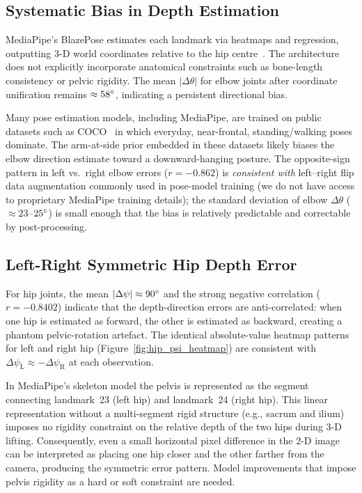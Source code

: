 \documentclass[twocolumn]{article}
\begin{document}
\subsection{Systematic Bias in Depth Estimation}

MediaPipe's BlazePose estimates each landmark via heatmaps and regression,
outputting 3-D world coordinates relative to the hip
centre~\cite{blazepose}. The architecture does not explicitly incorporate
anatomical constraints such as bone-length consistency or pelvic
rigidity. The mean $|\Delta\theta|$ for elbow joints after coordinate
unification remains $\approx58\degree{}$, indicating a persistent directional bias.

Many pose estimation models, including MediaPipe, are trained on public
datasets such as COCO~\cite{coco} in which everyday, near-frontal,
standing/walking poses dominate. The arm-at-side
prior embedded in these datasets likely biases the elbow direction estimate
toward a downward-hanging posture. The opposite-sign pattern in left vs.\
right elbow errors ($r=-0.862$) is \emph{consistent with} left--right flip
data augmentation commonly used in pose-model training (we do not have access
to proprietary MediaPipe training details); the standard deviation of elbow $\Delta\theta$
($\approx23$--$25\degree{}$) is small enough that the bias is relatively
predictable and correctable by post-processing.

\subsection{Left-Right Symmetric Hip Depth Error}

For hip joints, the mean $|\Delta\psi|\approx90\degree{}$ and the strong negative
correlation ($r=-0.8402$) indicate that the depth-direction errors are
anti-correlated: when one hip is estimated as forward, the other is
estimated as backward, creating a phantom pelvic-rotation artefact. The
identical absolute-value heatmap patterns for left and right hip
(Figure~\ref{fig:hip_psi_heatmap}) are consistent with
$\Delta\psi_{\text{L}} \approx -\Delta\psi_{\text{R}}$ at each observation.

In MediaPipe's skeleton model the pelvis is represented as the segment
connecting landmark~23 (left hip) and landmark~24 (right hip). This linear
representation without a multi-segment rigid structure (e.g., sacrum and
ilium) imposes no rigidity constraint on the relative depth of the two
hips during 3-D lifting. Consequently, even a small horizontal pixel
difference in the 2-D image can be interpreted as placing one hip closer
and the other farther from the camera, producing the symmetric error
pattern. Model improvements that impose pelvis rigidity as a hard or soft
constraint are needed.
\end{document}
